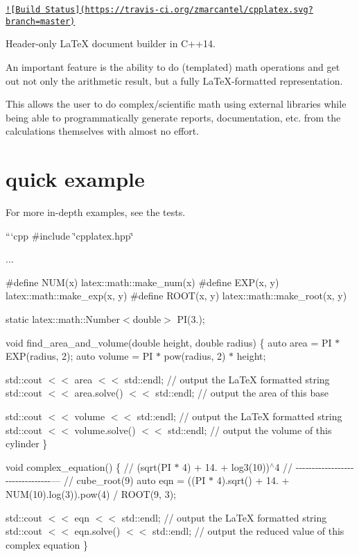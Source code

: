 \href{https://travis-ci.org/zmarcantel/cpplatex}{\tt !\mbox{[}Build Status\mbox{]}(https\-://travis-\/ci.\-org/zmarcantel/cpplatex.\-svg?branch=master)}

Header-\/only {\ttfamily La\-Te\-X} document builder in C++14.

An important feature is the ability to do (templated) math operations and get out not only the arithmetic result, but a fully {\ttfamily La\-Te\-X}-\/formatted representation.

This allows the user to do complex/scientific math using external libraries while being able to programmatically generate reports, documentation, etc. from the calculations themselves with almost no effort.

\section*{quick example}

For more in-\/depth examples, see the tests.

```cpp \#include \char`\"{}cpplatex.\-hpp\char`\"{}

...

\#define N\-U\-M(x) latex\-::math\-::make\-\_\-num(x) \#define E\-X\-P(x, y) latex\-::math\-::make\-\_\-exp(x, y) \#define R\-O\-O\-T(x, y) latex\-::math\-::make\-\_\-root(x, y)

static latex\-::math\-::\-Number$<$double$>$ P\-I(3.);

void find\-\_\-area\-\_\-and\-\_\-volume(double height, double radius) \{ auto area = P\-I $\ast$ E\-X\-P(radius, 2); auto volume = P\-I $\ast$ pow(radius, 2) $\ast$ height;

std\-::cout $<$$<$ area $<$$<$ std\-::endl; // output the La\-Te\-X formatted string std\-::cout $<$$<$ area.\-solve() $<$$<$ std\-::endl; // output the area of this base

std\-::cout $<$$<$ volume $<$$<$ std\-::endl; // output the La\-Te\-X formatted string std\-::cout $<$$<$ volume.\-solve() $<$$<$ std\-::endl; // output the volume of this cylinder \}

void complex\-\_\-equation() \{ // (sqrt(\-P\-I $\ast$ 4) + 14. + log3(10))$^\wedge$4 // -\/-\/-\/-\/-\/-\/-\/-\/-\/-\/-\/-\/-\/-\/-\/-\/-\/-\/-\/-\/-\/-\/-\/-\/-\/-\/-\/-\/-\/-\/-\/-\/--- // cube\-\_\-root(9) auto eqn = ((P\-I $\ast$ 4).sqrt() + 14. + N\-U\-M(10).log(3)).pow(4) / R\-O\-O\-T(9, 3);

std\-::cout $<$$<$ eqn $<$$<$ std\-::endl; // output the La\-Te\-X formatted string std\-::cout $<$$<$ eqn.\-solve() $<$$<$ std\-::endl; // output the reduced value of this complex equation \}

